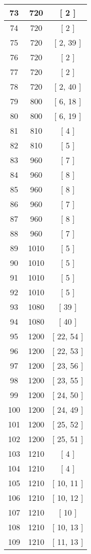 \begin{center}
\begin{longtable}[H]{|| c c c ||}
73 & 720 & [ 2 ] \\ 
\hline
74 & 720 & [ 2 ] \\ 
\hline
75 & 720 & [ 2, 39 ] \\ 
\hline
76 & 720 & [ 2 ] \\ 
\hline
77 & 720 & [ 2 ] \\ 
\hline
78 & 720 & [ 2, 40 ] \\ 
\hline
79 & 800 & [ 6, 18 ] \\ 
\hline
80 & 800 & [ 6, 19 ] \\ 
\hline
81 & 810 & [ 4 ] \\ 
\hline
82 & 810 & [ 5 ] \\ 
\hline
83 & 960 & [ 7 ] \\ 
\hline
84 & 960 & [ 8 ] \\ 
\hline
85 & 960 & [ 8 ] \\ 
\hline
86 & 960 & [ 7 ] \\ 
\hline
87 & 960 & [ 8 ] \\ 
\hline
88 & 960 & [ 7 ] \\ 
\hline
89 & 1010 & [ 5 ] \\ 
\hline
90 & 1010 & [ 5 ] \\ 
\hline
91 & 1010 & [ 5 ] \\ 
\hline
92 & 1010 & [ 5 ] \\ 
\hline
93 & 1080 & [ 39 ] \\ 
\hline
94 & 1080 & [ 40 ] \\ 
\hline
95 & 1200 & [ 22, 54 ] \\ 
\hline
96 & 1200 & [ 22, 53 ] \\ 
\hline
97 & 1200 & [ 23, 56 ] \\ 
\hline
98 & 1200 & [ 23, 55 ] \\ 
\hline
99 & 1200 & [ 24, 50 ] \\ 
\hline
100 & 1200 & [ 24, 49 ] \\ 
\hline
101 & 1200 & [ 25, 52 ] \\ 
\hline
102 & 1200 & [ 25, 51 ] \\ 
\hline
103 & 1210 & [ 4 ] \\ 
\hline
104 & 1210 & [ 4 ] \\ 
\hline
105 & 1210 & [ 10, 11 ] \\ 
\hline
106 & 1210 & [ 10, 12 ] \\ 
\hline
107 & 1210 & [ 10 ] \\ 
\hline
108 & 1210 & [ 10, 13 ] \\ 
\hline
109 & 1210 & [ 11, 13 ] \\ 

\end{longtable}
\end{center}
